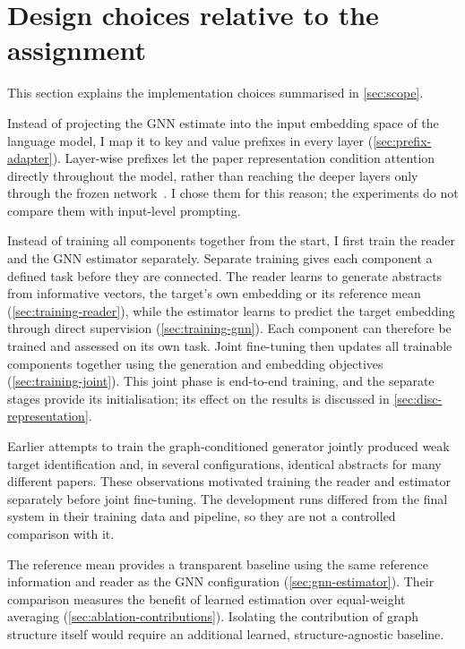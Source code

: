 \section{Design choices relative to the assignment}
\label{sec:disc-design}

This section explains the implementation choices summarised in \autoref{sec:scope}.

Instead of projecting the GNN estimate into the input embedding space of the language model, I map it to key and value prefixes in every layer (\autoref{sec:prefix-adapter}). Layer-wise prefixes let the paper representation condition attention directly throughout the model, rather than reaching the deeper layers only through the frozen network~\cite{liu2022ptuning}. I chose them for this reason; the experiments do not compare them with input-level prompting.

Instead of training all components together from the start, I first train the reader and the GNN estimator separately. Separate training gives each component a defined task before they are connected. The reader learns to generate abstracts from informative vectors, the target's own embedding or its reference mean (\autoref{sec:training-reader}), while the estimator learns to predict the target embedding through direct supervision (\autoref{sec:training-gnn}). Each component can therefore be trained and assessed on its own task. Joint fine-tuning then updates all trainable components together using the generation and embedding objectives (\autoref{sec:training-joint}). This joint phase is end-to-end training, and the separate stages provide its initialisation; its effect on the results is discussed in \autoref{sec:disc-representation}.

Earlier attempts to train the graph-conditioned generator jointly produced weak target identification and, in several configurations, identical abstracts for many different papers. These observations motivated training the reader and estimator separately before joint fine-tuning. The development runs differed from the final system in their training data and pipeline, so they are not a controlled comparison with it.

The reference mean provides a transparent baseline using the same reference information and reader as the GNN configuration (\autoref{sec:gnn-estimator}). Their comparison measures the benefit of learned estimation over equal-weight averaging (\autoref{sec:ablation-contributions}). Isolating the contribution of graph structure itself would require an additional learned, structure-agnostic baseline.
